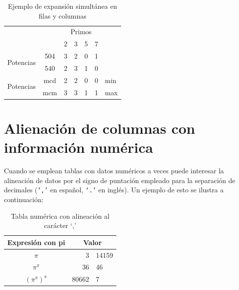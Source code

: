\documentclass[11pt,a4paper]{article}
\begin{document}
\begin{table}[H]%
	\centering
	\caption{Ejemplo de expansión simultánea en filas y columnas}
	\label{tab:expsimul}
	\begin{tabular}{cc|c|c|c|c|l} %
	\cline{3-6}
	& & \multicolumn{4}{|c|}{Primos} \\ \cline{3-6}
	& & 2 & 3 & 5 & 7 \\ \cline{1-6}
	\multicolumn{1}{|c|}{\multirow{2}{*}{Potencias}} &
	\multicolumn{1}{|c|}{504} & 3 & 2 & 0 & 1 &     \\ \cline{2-6}
	\multicolumn{1}{|c|}{}                        &
	\multicolumn{1}{|c|}{540} & 2 & 3 & 1 & 0 &     \\ \cline{1-6}
	\multicolumn{1}{|c|}{\multirow{2}{*}{Potencias}} &
	\multicolumn{1}{|c|}{mcd} & 2 & 2 & 0 & 0 & min \\ \cline{2-6}
	\multicolumn{1}{|c|}{}                        &
	\multicolumn{1}{|c|}{mcm} & 3 & 3 & 1 & 1 & max \\ \cline{1-6}
	\end{tabular}
\end{table}








\section{Alienación de columnas con información numérica}
Cuando se emplean tablas con datos numéricos a veces puede interesar la alineación de datos por el signo de puntación empleado para la separación de decimales (\texttt{`,'} en español, \texttt{`.'} en inglés). Un ejemplo de esto se ilustra a continuación:

\begin{table}[H]%
	\centering
	\caption{Tabla numérica con alineación al carácter `,'}
	\label{tab:alineada}
	\begin{tabular}{c r@{,} l}
    \toprule
	Expresión con pi & \multicolumn{2}{c}{Valor} \\
	\midrule
	$\pi$                   &      3 & 14159 \\
	$\pi^{\pi}$             & 36     &    46 \\
	$(\pi^{\pi})^{\pi}$     &  80662 & 7     \\
    \bottomrule
	\end{tabular}
\end{table}
\end{document}
